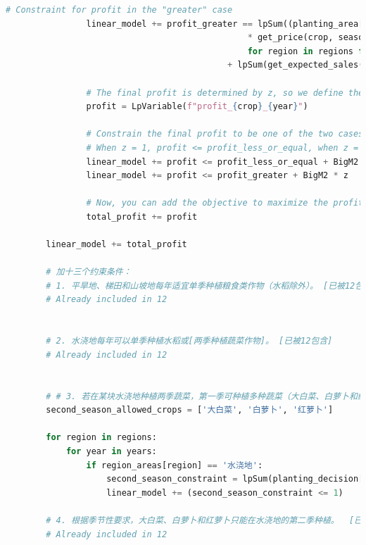 \documentclass{cumcmthesis}
\begin{document}
\begin{appendices}
\begin{lstlisting}[language=python]
                # Constraint for profit in the "greater" case
                linear_model += profit_greater == lpSum((planting_area[(crop, region, year, season)] * get_yield_per_acre(crop, region) - get_expected_sales(crop, season) - get_cost(crop, region))
                                                * get_price(crop, season) * (1 - reduction_factor)
                                                for region in regions for season in seasons) \
                                            + lpSum(get_expected_sales(crop, season) * get_price(crop, season) for season in seasons)
    
                # The final profit is determined by z, so we define the overall profit
                profit = LpVariable(f"profit_{crop}_{year}")
    
                # Constrain the final profit to be one of the two cases
                # When z = 1, profit <= profit_less_or_equal, when z = 0, profit <= profit_greater
                linear_model += profit <= profit_less_or_equal + BigM2 * (1 - z)
                linear_model += profit <= profit_greater + BigM2 * z
    
                # Now, you can add the objective to maximize the profit
                total_profit += profit
    
        linear_model += total_profit
    
        # 加十三个约束条件：
        # 1. 平旱地、梯田和山坡地每年适宜单季种植粮食类作物（水稻除外）。 [已被12包含]
        # Already included in 12
    
    
        # 2. 水浇地每年可以单季种植水稻或[两季种植蔬菜作物]。 [已被12包含]
        # Already included in 12
    
    
        # # 3. 若在某块水浇地种植两季蔬菜，第一季可种植多种蔬菜（大白菜、白萝卜和红萝卜除外）；第二季只能种植大白菜、白萝卜和红萝卜中的一种（便于管理）。
        second_season_allowed_crops = ['大白菜', '白萝卜', '红萝卜']
    
        for region in regions:
            for year in years:
                if region_areas[region] == '水浇地':
                    second_season_constraint = lpSum(planting_decision[(crop, region, year, '第二季')] for crop in second_season_allowed_crops)
                    linear_model += (second_season_constraint <= 1)
    
        # 4. 根据季节性要求，大白菜、白萝卜和红萝卜只能在水浇地的第二季种植。  [已被12包含]
        # Already included in 12      
    

\end{lstlisting}
\end{appendices}
\end{document}
